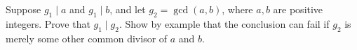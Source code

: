 Suppose $g_1\mid a$ and $g_1\mid b$, and let $g_2=\gcd(a,b)$, where $a,b$ are positive integers. Prove that $g_1\mid g_2$. Show by example that the conclusion can fail if $g_2$ is merely some other common divisor of $a$ and $b$.
